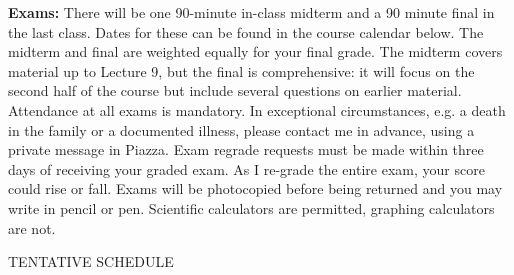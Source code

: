 \documentclass[11pt, letterpaper]{article}
\begin{document}
\noindent \textbf{Exams:} There will be one 90-minute in-class midterm and a 90 minute final in the last class. Dates
for these can be found in the course calendar below. The midterm and final are weighted equally
for your final grade. The midterm covers material up to Lecture 9, but the final is comprehensive:
it will focus on the second half of the course but include several questions on earlier material.
Attendance at
all exams is mandatory. In exceptional circumstances, e.g. a death in the family or a documented illness, please contact me in advance, using a private message in Piazza. Exam regrade
requests must be made within three days of receiving your graded exam. As I re-grade the entire
exam, your score could rise or fall. Exams will be photocopied before being returned and you may
write in pencil or pen. Scientific calculators are permitted, graphing calculators are not.

\medskip

\begin{center}
\small
TENTATIVE SCHEDULE
\end{center}
\end{document}
